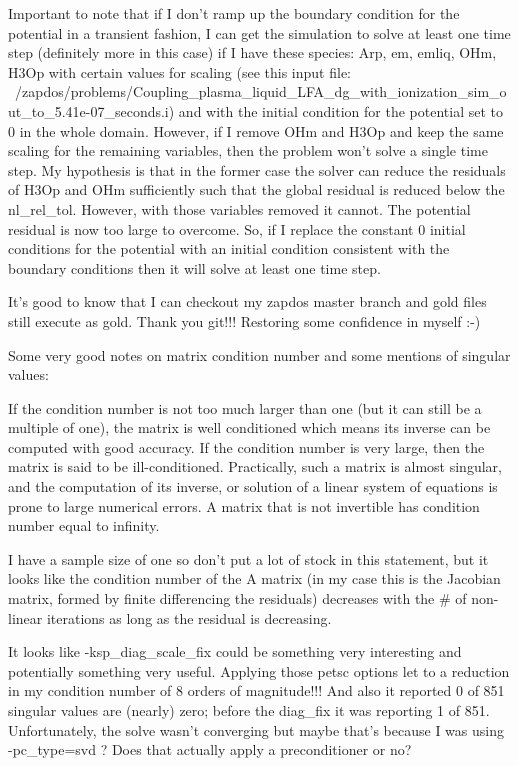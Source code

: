 {Important to note that if I don't ramp up the boundary condition for the potential in a transient fashion, I can get the simulation to solve at least one time step (definitely more in this case) if I have these species: Arp, em, emliq, OHm, H3Op with certain values for scaling (see this input file: ~/zapdos/problems/Coupling_plasma_liquid_LFA_dg_with_ionization_sim_out_to_5.41e-07_seconds.i) and with the initial condition for the potential set to 0 in the whole domain. However, if I remove OHm and H3Op and keep the same scaling for the remaining variables, then the problem won't solve a single time step. My hypothesis is that in the former case the solver can reduce the residuals of H3Op and OHm sufficiently such that the global residual is reduced below the nl_rel_tol. However, with those variables removed it cannot. The potential residual is now too large to overcome. So, if I replace the constant 0 initial conditions for the potential with an initial condition consistent with the boundary conditions then it will solve at least one time step.

It's good to know that I can checkout my zapdos master branch and gold files still execute as gold. Thank you git!!! Restoring some confidence in myself :-)

Some very good notes on matrix condition number and some mentions of singular values:

If the condition number is not too much larger than one (but it can still be a multiple of one), the matrix is well conditioned which means its inverse can be computed with good accuracy. If the condition number is very large, then the matrix is said to be ill-conditioned. Practically, such a matrix is almost singular, and the computation of its inverse, or solution of a linear system of equations is prone to large numerical errors. A matrix that is not invertible has condition number equal to infinity.

I have a sample size of one so don't put a lot of stock in this statement, but it looks like the condition number of the A matrix (in my case this is the Jacobian matrix, formed by finite differencing the residuals) decreases with the # of non-linear iterations as long as the residual is decreasing.

It looks like -ksp_diag_scale_fix could be something very interesting and potentially something very useful. Applying those petsc options let to a reduction in my condition number of 8 orders of magnitude!!! And also it reported 0 of 851 singular values are (nearly) zero; before the diag_fix it was reporting 1 of 851. Unfortunately, the solve wasn't converging but maybe that's because I was using -pc_type=svd ? Does that actually apply a preconditioner or no?

}

